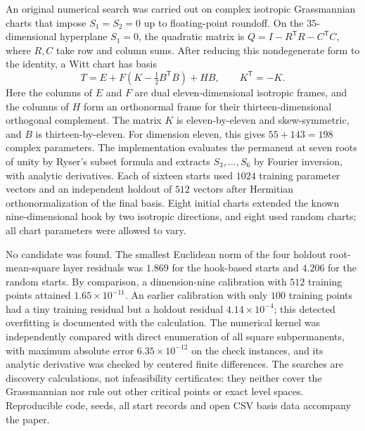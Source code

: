 An original numerical search was carried out on complex isotropic Grassmannian charts that impose $S_1=S_2=0$ up to floating-point roundoff. On the $35$-dimensional hyperplane $S_1=0$, the quadratic matrix is $Q=I-R^{\mathsf T}R-C^{\mathsf T}C$, where $R,C$ take row and column sums. After reducing this nondegenerate form to the identity, a Witt chart has basis
\[
 T=E+F\left(K-\tfrac12B^{\mathsf T}B\right)+HB,
 \qquad K^{\mathsf T}=-K.
\]
Here the columns of $E$ and $F$ are dual eleven-dimensional isotropic frames, and the columns of $H$ form an orthonormal frame for their thirteen-dimensional orthogonal complement. The matrix $K$ is eleven-by-eleven and skew-symmetric, and $B$ is thirteen-by-eleven. For dimension eleven, this gives $55+143=198$ complex parameters.
The implementation evaluates the permanent at seven roots of unity by Ryser's subset formula and extracts $S_3,\ldots,S_6$ by Fourier inversion, with analytic derivatives.
Each of sixteen starts used $1024$ training parameter vectors and an independent holdout of $512$ vectors after Hermitian orthonormalization of the final basis. Eight initial charts extended the known nine-dimensional hook by two isotropic directions, and eight used random charts; all chart parameters were allowed to vary.

No candidate was found. The smallest Euclidean norm of the four holdout root-mean-square layer residuals was $1.869$ for the hook-based starts and $4.206$ for the random starts. By comparison, a dimension-nine calibration with $512$ training points attained $1.65\times10^{-11}$. An earlier calibration with only $100$ training points had a tiny training residual but a holdout residual $4.14\times10^{-4}$; this detected overfitting is documented with the calculation.
The numerical kernel was independently compared with direct enumeration of all square subpermanents, with maximum absolute error $6.35\times10^{-12}$ on the check instances, and its analytic derivative was checked by centered finite differences.
The searches are discovery calculations, not infeasibility certificates: they neither cover the Grassmannian nor rule out other critical points or exact level spaces. Reproducible code, seeds, all start records and open CSV basis data accompany the paper.
